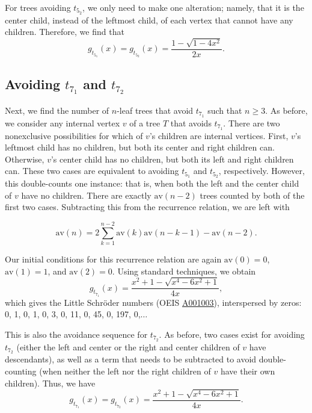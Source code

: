 \documentclass[12pt]{article}
\newcommand{\seqnum}[1]{\href{http://oeis.org/#1}{\underline{#1}}}
\begin{document}
For trees avoiding $t_{5_2}$, we only need to make one alteration; namely, that it is the center child, instead of the leftmost child, of each vertex that cannot have any children.  Therefore, we find that $$g_{t_{5_1}}(x)=g_{t_{5_2}}(x)=\frac{1 - \sqrt{1-4x^2}}{2x}.$$

\subsection{Avoiding \texorpdfstring{$t_{7_1}$}{t71} and \texorpdfstring{$t_{7_2}$}{t72}}

Next, we find the number of $n$-leaf trees that avoid $t_{7_1}$ such that $n\geq3$. As before, we consider any internal vertex $v$ of a tree $T$ that avoids $t_{7_1}$.  There are two nonexclusive possibilities for which of $v$'s children are internal vertices. First, $v$'s leftmost child has no children, but both its center and right children can. Otherwise, $v$'s center child has no children, but both its left and right children can.  These two cases are equivalent to avoiding $t_{5_1}$ and $t_{5_2}$, respectively.  However, this double-counts one instance: that is, when both the left and the center child of $v$ have no children. There are exactly $\text{av}(n-2)$ trees counted by both of the first two cases. Subtracting this from the recurrence relation, we are left with

$$\text{av}(n) = 2\sum_{k=1}^{n-2}\text{av}(k) \text{av}(n-k-1) - \text{av}(n-2).$$

Our initial conditions for this recurrence relation are again $\text{av}(0) = 0$, $\text{av}(1) = 1$, and $\text{av}(2) = 0$.  Using standard techniques, we obtain $$g_{t_{7_1}}(x) = \frac{x^2 +1 - \sqrt{x^4 - 6x^2 +1}}{4x},$$ which gives the Little Schr\"{o}der numbers (OEIS \seqnum{A001003}), interspersed by zeros:  0, 1, 0, 1, 0, 3, 0, 11, 0, 45, 0, 197, 0,$\dots$ 

This is also the avoidance sequence for $t_{7_2}$.  As before, two cases exist for avoiding $t_{7_2}$ (either the left and center or the right and center children of $v$ have descendants), as well as a term that needs to be subtracted to avoid double-counting (when neither the left nor the right children of $v$ have their own children).  Thus, we have $$g_{t_{7_1}}(x)=g_{t_{7_2}}(x) = \frac{x^2 +1 - \sqrt{x^4 - 6x^2 +1}}{4x}.$$
\end{document}
